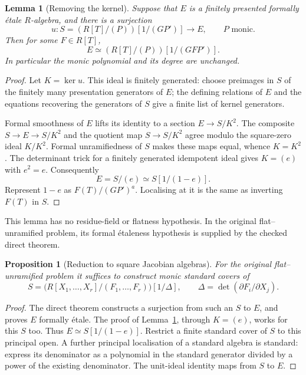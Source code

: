 \documentclass[11pt]{article}
\newtheorem{lemma}[theorem]{Lemma}
\newtheorem{proposition}[theorem]{Proposition}
\begin{document}
\begin{lemma}[Removing the kernel]\label{lem:kernel}
Suppose that $E$ is a finitely presented formally \'etale $R$-algebra,
and there is a surjection
\[
        u:S=(R[T]/(P))[1/(GP')]\longrightarrow E,
        \qquad P\text{ monic}.
\]
Then for some $F\in R[T]$,
\[
             E\simeq(R[T]/(P))[1/(GFP')].
\]
In particular the monic polynomial and its degree are unchanged.
\end{lemma}
\begin{proof}
Let $K=\ker u$. This ideal is finitely generated: choose preimages in
$S$ of the finitely many presentation generators of $E$; the defining
relations of $E$ and the equations recovering the generators of $S$
give a finite list of kernel generators.

Formal smoothness of $E$ lifts its identity to a section
$E\to S/K^2$. The composite $S\to E\to S/K^2$ and the quotient map
$S\to S/K^2$ agree modulo the square-zero ideal $K/K^2$. Formal
unramifiedness of $S$ makes these maps equal, whence $K=K^2$.
The determinant trick for a finitely generated idempotent ideal gives
$K=(e)$ with $e^2=e$. Consequently
\[
                    E=S/(e)\simeq S[1/(1-e)].
\]
Represent $1-e$ as $F(T)/(GP')^a$. Localising at it is the same as
inverting $F(T)$ in $S$.
\end{proof}

This lemma has no residue-field or flatness hypothesis. In the original
flat--unramified problem, its formal \'etaleness hypothesis is supplied
by the checked direct theorem.

\begin{proposition}[Reduction to square Jacobian algebras]
For the original flat--unramified problem it suffices to construct monic
standard covers of
\[
 S=\bigl(R[X_1,\ldots,X_r]/(F_1,\ldots,F_r)\bigr)[1/\Delta],
 \qquad \Delta=\det(\partial F_i/\partial X_j).
\]
\end{proposition}
\begin{proof}
The direct theorem constructs a surjection from such an $S$ to $E$,
and proves $E$ formally \'etale. The proof of
Lemma~\ref{lem:kernel}, through $K=(e)$, works for this $S$ too.
Thus $E\simeq S[1/(1-e)]$. Restrict a finite standard cover of $S$ to
this principal open. A further principal localisation of a standard
algebra is standard: express its denominator as a polynomial in the
standard generator divided by a power of the existing denominator.
The unit-ideal identity maps from $S$ to $E$.
\end{proof}
\end{document}
